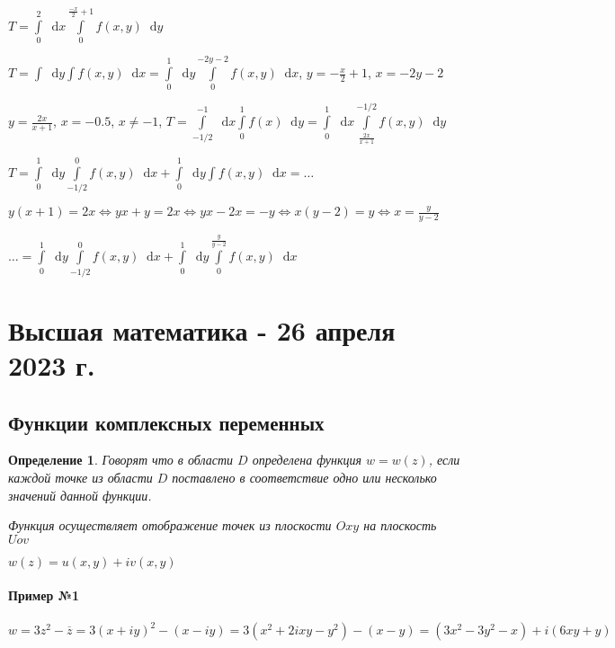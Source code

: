 \documentclass{article}
\newcommand*\diff{\mathop{}\!\mathrm{d}}
\newtheorem{definition}{Определение}
\begin{document}
$T = \int\limits_{0}^{2} \diff x \int\limits_{0}^{\frac{-x}{2} + 1} f(x, y) \diff y$

$T = \int \diff y \int f(x, y) \diff x = \int\limits_{0}^{1} \diff y \int\limits_{0}^{- 2 y - 2} f(x, y) \diff x$, $y = -\frac{x}{2} + 1$, $x = -2y - 2$

\hfill

$y = \frac{2 x}{x + 1}$, $x = -0.5$, $x \ne -1$, $T = \int\limits_{-1/2}^{-1} \diff x \int\limits_{0}^{1} f(x) \diff y = \int\limits_{0}^{1} \diff x \int\limits_{\frac{2 x}{x + 1}}^{-1/2} f(x, y) \diff y$

$T = \int\limits_{0}^{1} \diff y \int\limits_{-1/2}^{0} f(x, y) \diff x + \int\limits_{0}^{1} \diff y \int f(x, y) \diff x = \dots$

$y (x + 1) = 2 x \Longleftrightarrow y x + y = 2 x \Longleftrightarrow y x - 2 x = - y \Longleftrightarrow x (y - 2) = y \Longleftrightarrow x = \frac{y}{y - 2}$

$\dots = \int\limits_{0}^{1} \diff y \int\limits_{-1/2}^{0} f(x, y) \diff x + \int\limits_{0}^{1} \diff y \int\limits_{0}^{\frac{y}{y - 2}} f(x, y) \diff x$

\pagebreak
\section{Высшая математика - 26 апреля 2023 г.}

\subsection{Функции комплексных переменных}

\begin{definition}
Говорят что в области $D$ определена функция $w = w(z)$, если каждой точке из области $D$ поставлено в соответствие одно или несколько значений данной функции.

Функция осуществляет отображение точек из плоскости $O x y$ на плоскость $U o v$
\end{definition}

$w(z) = u(x, y) + i v (x, y)$

\paragraph{Пример №1}

$w = 3 z^2 - \overline{z} = 3 (x + i y)^2 - (x - i y) = 3 (x^2 + 2 i x y - y^2) - (x - y) = (3x^2 - 3y^2 - x) + i (6 x y + y)$

\hfill
\end{document}
